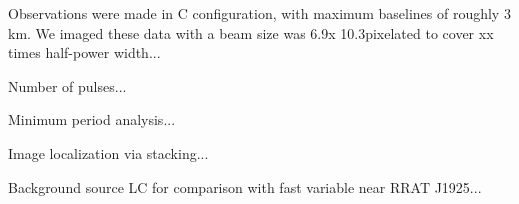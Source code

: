 Observations were made in C configuration, with maximum baselines of roughly 3 km. We imaged these data with a beam size was 6.9\arcsec x 10.3\arcsec pixelated to cover xx times half-power width...

Number of pulses...

Minimum period analysis...

Image localization via stacking...

Background source LC for comparison with fast variable near RRAT J1925...
  
  